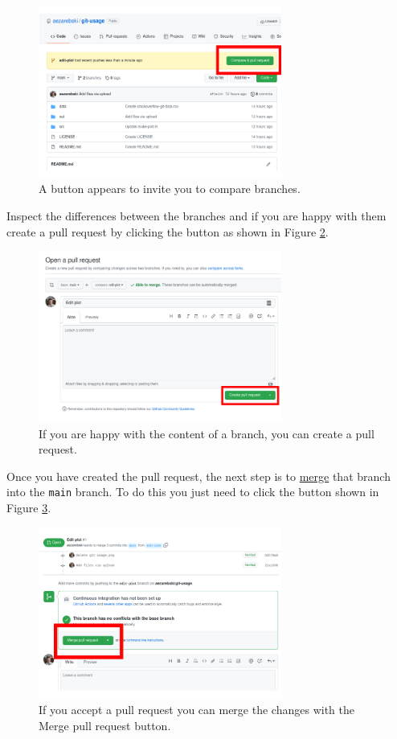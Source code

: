 \documentclass[11pt,onecolumn]{scrartcl}
\begin{document}
\begin{figure}[htbp]
\centering
\includegraphics[width=8cm]{./pull-request.png}
\caption{\label{fig:pull-request}A button appears to invite you to compare branches.}
\end{figure}

Inspect the differences between the branches and if you are happy with them
create a pull request by clicking the button as shown in Figure
\ref{fig:create-pull-request}.

\begin{figure}[htbp]
\centering
\includegraphics[width=8cm]{./create-pull-request.png}
\caption{\label{fig:create-pull-request}If you are happy with the content of a branch, you can create a pull request.}
\end{figure}

Once you have created the pull request, the next step is to \hyperref[sec:org8f2ea49]{merge} that branch
into the \texttt{main} branch. To do this you just need to click the button shown in
Figure \ref{fig:merge-pull-request}.

\begin{figure}[htbp]
\centering
\includegraphics[width=8cm]{./merge-pull-request.png}
\caption{\label{fig:merge-pull-request}If you accept a pull request you can merge the changes with the Merge pull request button.}
\end{figure}
\end{document}
